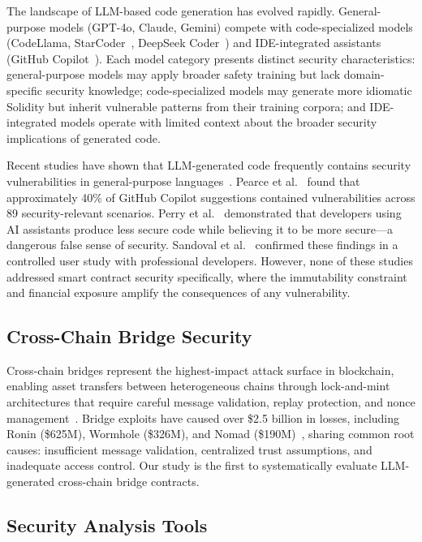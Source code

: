 The landscape of LLM-based code generation has evolved rapidly. General-purpose models (GPT-4o, Claude, Gemini) compete with code-specialized models (CodeLlama, StarCoder~\cite{li2023starcoder}, DeepSeek Coder~\cite{guo2024deepseek}) and IDE-integrated assistants (GitHub Copilot~\cite{github_copilot}). Each model category presents distinct security characteristics: general-purpose models may apply broader safety training but lack domain-specific security knowledge; code-specialized models may generate more idiomatic Solidity but inherit vulnerable patterns from their training corpora; and IDE-integrated models operate with limited context about the broader security implications of generated code.

Recent studies have shown that LLM-generated code frequently contains security vulnerabilities in general-purpose languages~\cite{copilot_eval, perry2023users, sandoval2023lost}. Pearce et al.~\cite{copilot_eval} found that approximately 40\% of GitHub Copilot suggestions contained vulnerabilities across 89 security-relevant scenarios. Perry et al.~\cite{perry2023users} demonstrated that developers using AI assistants produce less secure code while believing it to be more secure---a dangerous false sense of security. Sandoval et al.~\cite{sandoval2023lost} confirmed these findings in a controlled user study with professional developers. However, none of these studies addressed smart contract security specifically, where the immutability constraint and financial exposure amplify the consequences of any vulnerability.

\subsection{Cross-Chain Bridge Security}

Cross-chain bridges represent the highest-impact attack surface in blockchain, enabling asset transfers between heterogeneous chains through lock-and-mint architectures that require careful message validation, replay protection, and nonce management~\cite{belchior2021survey}. Bridge exploits have caused over \$2.5 billion in losses, including Ronin (\$625M), Wormhole (\$326M), and Nomad (\$190M)~\cite{bridge_hacks, zhang2023bridge}, sharing common root causes: insufficient message validation, centralized trust assumptions, and inadequate access control. Our study is the first to systematically evaluate LLM-generated cross-chain bridge contracts.

\subsection{Security Analysis Tools}


